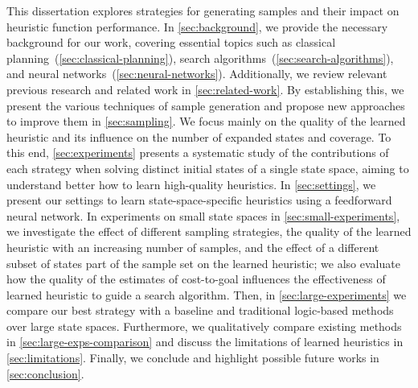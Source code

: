 This dissertation explores strategies for generating samples and their impact on heuristic function performance. In \cref{sec:background}, we provide the necessary background for our work, covering essential topics such as classical planning~(\cref{sec:classical-planning}), search algorithms~(\cref{sec:search-algorithms}), and neural networks~(\cref{sec:neural-networks}). Additionally, we review relevant previous research and related work in \cref{sec:related-work}. By establishing this, we present the various techniques of sample generation and propose new approaches to improve them in \cref{sec:sampling}. We focus mainly on the quality of the learned heuristic and its influence on the number of expanded states and coverage. To this end, \cref{sec:experiments} presents a systematic study of the contributions of each strategy when solving distinct initial states of a single state space, aiming to understand better how to learn high-quality heuristics. In \cref{sec:settings}, we present our settings to learn state-space-specific heuristics using a feedforward neural network. In experiments on small state spaces in \cref{sec:small-experiments}, we investigate the effect of different sampling strategies, the quality of the learned heuristic with an increasing number of samples, and the effect of a different subset of states part of the sample set on the learned heuristic; we also evaluate how the quality of the estimates of cost-to-goal influences the effectiveness of learned heuristic to guide a search algorithm. Then, in \cref{sec:large-experiments} we compare our best strategy with a baseline and traditional logic-based methods over large state spaces. Furthermore, we qualitatively compare existing methods in \cref{sec:large-exps-comparison} and discuss the limitations of learned heuristics in \cref{sec:limitations}. Finally, we conclude and highlight possible future works in \cref{sec:conclusion}.
